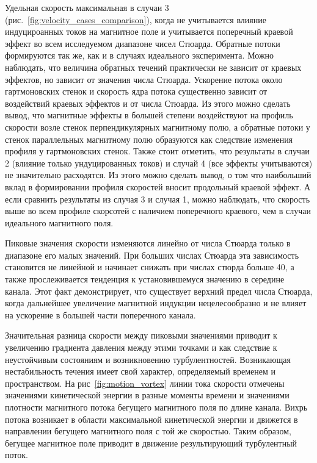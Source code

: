 Удельная скорость максимальная в случаи 3 (рис.~\ref{fig:velocity_cases_comparison}), когда не учитывается влияние индуцироанных токов на магнитное поле и учитывается поперечный краевой эффект во всем исследуемом диапазоне чисел Стюарда. Обратные потоки формируются так же, как и в случаях идеального эксперимента. Можно наблюдать, что величина обратных течений практически не зависит от краевых эффектов, но зависит от значения числа Стюарда. 
Ускорение потока около гартмоновских стенок и скорость ядра потока существенно зависит от воздействий краевых эффектов и от числа Стюарда. Из этого можно сделать вывод, что магнитные эффекты в большей степени воздействуют на профиль скорости возле стенок перпендикулярных магнитному полю, а обратные потоки у стенок параллельных магнитному полю образуются как следствие изменения профиля у гартмоновских стенок. Также стоит отметить, что результаты в случаи 2 (влияние только ундуцированных токов) и случай 4 (все эффекты учитываются) не значительно расходятся. Из этого можно сделать вывод, о том что наибольший вклад в формировании профиля скоростей вносит продольный краевой эффект. А если сравнить результаты из  случая 3 и случая 1, можно наблюдать, что скорость выше во всем профиле скорсотей с наличием поперечного краевого, чем в случаи идеального магнитного поля. 

Пиковые значения скорости изменяются линейно от числа Стюарда только в диапазоне его малых значений. При больших числах Стюарда эта зависимость становится не линейной и начинает снижать при числах стюрда больше 40, а также прослеживается тенденция к установившемуся значению в середине канала. Этот факт демонстрирует, что существует верхний предел числа Стюарда, когда дальнейшее увеличение магнитной индукции нецелесообразно и не влияет на ускорение в большей части поперечного канала. 

Значительная разница скорости между пиковыми значениями приводит к увеличению градиента давления между этими точками и как следствие к неустойчивым состояниям и возникновению турбулентностей. Возникающая нестабильность течения имеет свой характер, определяемый временем и пространством. На рис~\ref{fig:motion_vortex} линии тока скорости отмечены значениями кинетической энергии в разные моменты времени и значениями плотности магнитного потока бегущего магнитного поля по длине канала. Вихрь потока возникает в области максимальной кинетической энергии и движется в направлении бегущего магнитного поля с той же скоростью. Таким образом, бегущее магнитное поле приводит в движение результирующий турбулентный поток. 

